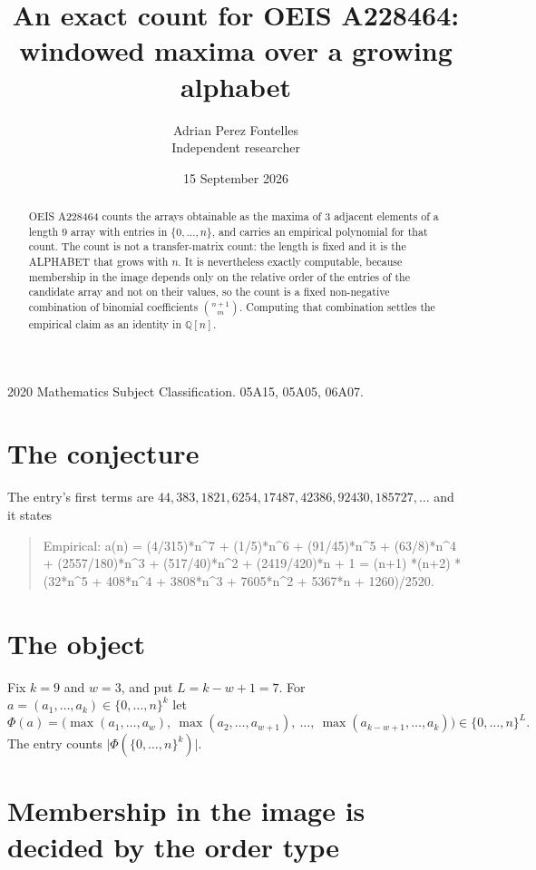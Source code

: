 \documentclass[11pt,a4paper]{article}
\title{An exact count for OEIS A228464: windowed maxima over a growing alphabet}
\author{Adrian Perez Fontelles\\ \small Independent researcher}
\date{15 September 2026}
\theoremstyle{plain}
\theoremstyle{definition}
\begin{document}
\maketitle

\begin{abstract}
OEIS A228464 counts the arrays obtainable as the maxima of $3$ adjacent elements of a length
$9$ array with entries in $\{0,\dots,n\}$, and carries an empirical polynomial for that
count. The count is not a transfer-matrix count: the length is fixed and it is the ALPHABET
that grows with $n$. It is nevertheless exactly computable, because membership in the image
depends only on the relative order of the entries of the candidate array and not on their
values, so the count is a fixed non-negative combination of binomial coefficients
$\binom{n+1}{m}$. Computing that combination settles the empirical claim as an identity in
$\mathbb{Q}[n]$.
\end{abstract}

\noindent\small 2020 Mathematics Subject Classification. 05A15, 05A05, 06A07.\normalsize

\section{The conjecture}

The entry's first terms are $44, 383, 1821, 6254, 17487, 42386, 92430, 185727,\dots$ and it states

\begin{quote}\raggedright Empirical: a(n) = (4/315)*n\^{}7 + (1/5)*n\^{}6 + (91/45)*n\^{}5 + (63/8)*n\^{}4 + (2557/180)*n\^{}3 + (517/40)*n\^{}2 + (2419/420)*n + 1 = (n+1) *(n+2) *(32*n\^{}5 + 408*n\^{}4 + 3808*n\^{}3 + 7605*n\^{}2 + 5367*n + 1260)/2520.\end{quote}

\section{The object}

Fix $k=9$ and $w=3$, and put $L=k-w+1=7$. For $a=(a_1,\dots,a_k)\in\{0,\dots,n\}^k$
let
\[
  \Phi(a)=\bigl(\max(a_1,\dots,a_w),\ \max(a_2,\dots,a_{w+1}),\ \dots,\
  \max(a_{k-w+1},\dots,a_k)\bigr)\in\{0,\dots,n\}^{L} .
\]
The entry counts $\lvert\Phi(\{0,\dots,n\}^k)\rvert$.

\section{Membership in the image is decided by the order type}
\end{document}
